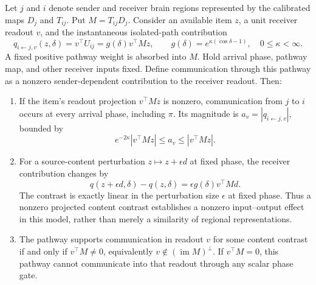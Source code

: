 \documentclass[submission,nolinenumbers]{esj}
\DeclareMathOperator{\im}{im}
\begin{document}
\begin{theorem}\label{thm:inter}
Let $j$ and $i$ denote sender and receiver brain regions represented by the calibrated maps $D_j$ and $T_{ij}$. Put $M=T_{ij}D_j$. Consider an available item $z$, a unit receiver readout $v$, and the instantaneous isolated-path contribution
\begin{equation}
q_{i\leftarrow j,v}(z,\delta)=v^\top U_{ij}=g(\delta)v^\top Mz,\qquad
 g(\delta)=e^{\kappa(\cos\delta-1)},\quad 0\le\kappa<\infty.
\label{eq:communication}
\end{equation}
A fixed positive pathway weight is absorbed into $M$. Hold arrival phase, pathway map, and other receiver inputs fixed. Define communication through this pathway as a nonzero sender-dependent contribution to the receiver readout. Then:
\begin{enumerate}[label=(\roman*),leftmargin=*]
\item If the item's readout projection $v^\top Mz$ is nonzero, communication from $j$ to $i$ occurs at every arrival phase, including $\pi$. Its magnitude is $a_v=|q_{i\leftarrow j,v}|$, bounded by
\[
e^{-2\kappa}|v^\top Mz|\le a_v\le |v^\top Mz|.
\]
\item For a source-content perturbation $z\mapsto z+\epsilon d$ at fixed phase, the receiver contribution changes by
\begin{equation}
q(z+\epsilon d,\delta)-q(z,\delta)=\epsilon g(\delta)v^\top Md.
\label{eq:projectioncontrast}
\end{equation}
The contrast is exactly linear in the perturbation size $\epsilon$ at fixed phase. Thus a nonzero projected content contrast establishes a nonzero input--output effect in this model, rather than merely a similarity of regional representations.
\item The pathway supports communication in readout $v$ for some content contrast if and only if $v^\top M\ne0$, equivalently $v\notin(\im M)^\perp$. If $v^\top M=0$, this pathway cannot communicate into that readout through any scalar phase gate.
\end{enumerate}
\end{theorem}
\end{document}
